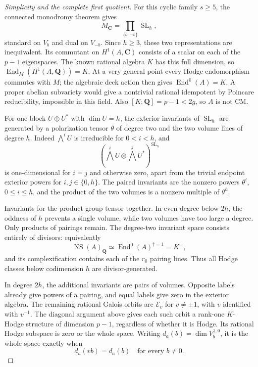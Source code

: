 \documentclass[11pt]{article}
\theoremstyle{definition}
\newcommand{\Q}{\mathbf Q}
\newcommand{\C}{\mathbf C}
\newcommand{\SL}{\operatorname{SL}}
\newcommand{\End}{\operatorname{End}}
\begin{document}
\begin{proof}[Simplicity and the complete first quotient]
For this cyclic family $s\ge5$, the connected monodromy theorem gives
\[
 M_\C=\prod_{\{b,-b\}}\SL_h,
\]
standard on $V_b$ and dual on $V_{-b}$. Since $h\ge3$, these two
representations are inequivalent. Its commutant on $H^1(A,\C)$ consists
of a scalar on each of the $p-1$ eigenspaces. The known rational algebra
$K$ has this full dimension, so $\End_M(H^1(A,\Q))=K$. At a very
general point every Hodge endomorphism commutes with $M$; the algebraic
deck action then gives $\End^0(A)=K$. A proper abelian subvariety would
give a nontrivial rational idempotent by Poincare reducibility, impossible
in this field. Also $[K:\Q]=p-1<2g$, so $A$ is not CM.

For one block $U\oplus U^*$ with $\dim U=h$, the exterior invariants
of $\SL_h$ are generated by a polarization tensor $\theta$ of degree
two and the two volume lines of degree $h$. Indeed
$\bigwedge^iU$ is irreducible for $0<i<h$, and
\[
 (\bigwedge^iU\otimes\bigwedge^jU^*)^{\SL_h}
\]
is one-dimensional for $i=j$ and otherwise zero, apart from the trivial
endpoint exterior powers for $i,j\in\{0,h\}$. The paired invariants
are the nonzero powers $\theta^i$, $0\le i\le h$, and the product of
the two volumes is a nonzero multiple of $\theta^h$.

Invariants for the product group tensor together. In even degree below
$2h$, the oddness of $h$ prevents a single volume, while two volumes have
too large a degree. Only products of pairings remain. The degree-two
invariant space consists entirely of divisors: equivalently
\[
 \operatorname{NS}(A)_\Q\simeq\End^0(A)^{\dagger=1}=K^+,
\]
and its complexification contains each of the $r_0$ pairing lines.
Thus all Hodge classes below codimension $h$ are divisor-generated.

In degree $2h$, the additional invariants are pairs of volumes.
Opposite labels already give powers of a pairing, and equal labels give
zero in the exterior algebra. The remaining rational Galois orbits are
$\mathscr E_v$ for $v\ne\pm1$, with $v$ identified with $v^{-1}$.
The diagonal argument above gives each such orbit a rank-one $K$-Hodge
structure of dimension $p-1$, regardless of whether it is Hodge.
Its rational Hodge subspace is zero or the whole space. Writing
$d_a(b)=\dim V_b^{1,0}$, it is the whole space exactly when
\begin{equation}\label{eq:stabilizer}
                   d_a(vb)=d_a(b)\quad\text{for every }b\ne0.
\end{equation}


\end{proof}
\end{document}
